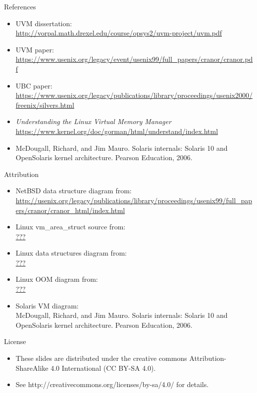 \documentclass[aspectratio=169]{beamer}
\newcommand{\bi}{\begin{itemize}}
\newcommand{\ei}{\end{itemize}}
\begin{document}
\begin{frame}[noframenumbering]{References}
  \small
  \bi
\item UVM dissertation:\\
  \url{http://vorpal.math.drexel.edu/course/opsys2/uvm-project/uvm.pdf}
\item UVM paper:\\
  {\footnotesize\url{https://www.usenix.org/legacy/event/usenix99/full_papers/cranor/cranor.pdf}}
\item UBC paper:\\
  \url{https://www.usenix.org/legacy/publications/library/proceedings/usenix2000/freenix/silvers.html}
\item \textsl{Understanding the Linux Virtual Memory Manager}\\
  \url{https://www.kernel.org/doc/gorman/html/understand/index.html}
\item McDougall, Richard, and Jim Mauro. Solaris internals: Solaris 10 and OpenSolaris kernel architecture. Pearson Education, 2006.
  \ei
\end{frame}

\begin{frame}[noframenumbering]{Attribution}
  \bi
\item NetBSD data structure diagram from:\\
  {\tiny\url{http://usenix.org/legacy/publications/library/proceedings/usenix99/full_papers/cranor/cranor_html/index.html}}
\item Linux vm\_area\_struct source from:\\
  \url{???}
\item Linux data structures diagram from:\\
  \url{???}
\item Linux OOM diagram from:\\
  \url{???}
\item Solaris VM diagram:\\McDougall, Richard, and Jim Mauro. Solaris internals: Solaris 10 and
    OpenSolaris kernel architecture. Pearson Education, 2006.
  \ei
\end{frame}

\begin{frame}[noframenumbering]{License}
  \bi
\item These slides are distributed under the creative commons
  Attribution-ShareAlike 4.0 International (CC BY-SA 4.0).
\item See http://creativecommons.org/licenses/by-sa/4.0/ for details.
  \ei
\end{frame}
\end{document}
